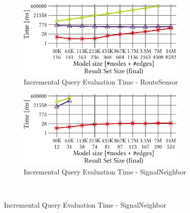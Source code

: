 \begin{figure}[ht]
\begin{center}
	\begin{subfigure}[t]{0.48\textwidth}\centering
	    \includegraphics[width=0.9\textwidth]{figures/trainBenchmark_User_SumInc_RouteSensor}
	    \caption{Incremental Query Evaluation Time - RouteSensor}
	    \label{fig:SumInc_RouteSensor}
	\end{subfigure}
	\begin{subfigure}[t]{0.48\textwidth}\centering
	    \includegraphics[width=0.9\textwidth]{figures/trainBenchmark_User_SumInc_SignalNeighbor}
	    \caption{Incremental Query Evaluation Time - SignalNeighbor}
	    \label{fig:SumInc_SignalNeighbor}
	\end{subfigure} \\


\end{center}
\end{figure}
